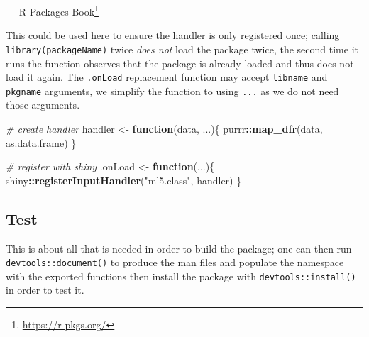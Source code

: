\documentclass[
  10pt,
]{krantz}
\makeatletter
\newenvironment{Shaded}{\begin{snugshade}}{\end{snugshade}}
\newcommand{\CommentTok}[1]{\textcolor[rgb]{0.37,0.37,0.37}{\textit{#1}}}
\newcommand{\ControlFlowTok}[1]{\textcolor[rgb]{0.27,0.27,0.27}{\textbf{#1}}}
\newcommand{\KeywordTok}[1]{\textcolor[rgb]{0.27,0.27,0.27}{\textbf{#1}}}
\newcommand{\NormalTok}[1]{#1}
\newcommand{\OperatorTok}[1]{\textcolor[rgb]{0.43,0.43,0.43}{\textbf{#1}}}
\newcommand{\StringTok}[1]{\textcolor[rgb]{0.5,0.5,0.5}{#1}}
\renewcommand{\href}[2]{#2\footnote{\url{#1}}}
\newenvironment{kframe}{%
\medskip{}
\setlength{\fboxsep}{.8em}
 \def\at@end@of@kframe{}%
 \ifinner\ifhmode%
  \def\at@end@of@kframe{\end{minipage}}%
  \begin{minipage}{\columnwidth}%
 \fi\fi%
 \def\FrameCommand##1{\hskip\@totalleftmargin \hskip-\fboxsep
 \colorbox{shadecolor}{##1}\hskip-\fboxsep
     \hskip-\linewidth \hskip-\@totalleftmargin \hskip\columnwidth}%
 \MakeFramed {\advance\hsize-\width
   \@totalleftmargin\z@ \linewidth\hsize
   \@setminipage}}%
 {\par\unskip\endMakeFramed%
 \at@end@of@kframe}
\renewenvironment{Shaded}{\begin{kframe}}{\end{kframe}}
\makeatother
\begin{document}
--- \href{https://r-pkgs.org/}{R Packages Book}

This could be used here to ensure the handler is only registered once; calling \texttt{library(packageName)} twice \emph{does not} load the package twice, the second time it runs the function observes that the package is already loaded and thus does not load it again. The \texttt{.onLoad} replacement function may accept \texttt{libname} and \texttt{pkgname} arguments, we simplify the function to using \texttt{...} as we do not need those arguments.

\begin{Shaded}
\begin{Highlighting}[]
\CommentTok{\# create handler}
\NormalTok{handler <{-}}\StringTok{ }\ControlFlowTok{function}\NormalTok{(data, ...)\{}
\NormalTok{  purrr}\OperatorTok{::}\KeywordTok{map\_dfr}\NormalTok{(data, as.data.frame)}
\NormalTok{\}}

\CommentTok{\# register with shiny}
\NormalTok{.onLoad <{-}}\StringTok{ }\ControlFlowTok{function}\NormalTok{(...)\{}
\NormalTok{  shiny}\OperatorTok{::}\KeywordTok{registerInputHandler}\NormalTok{(}\StringTok{"ml5.class"}\NormalTok{, handler)}
\NormalTok{\}}
\end{Highlighting}
\end{Shaded}

\hypertarget{shiny-complete-pkg-test}{%
\subsection{Test}\label{shiny-complete-pkg-test}}

This is about all that is needed in order to build the package; one can then run \texttt{devtools::document()} to produce the man files and populate the namespace with the exported functions then install the package with \texttt{devtools::install()} in order to test it.
\end{document}
